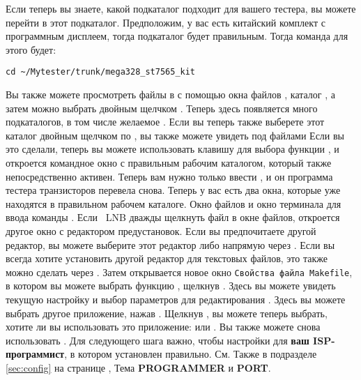 Если теперь вы знаете, какой подкаталог подходит для вашего тестера,
вы можете перейти в этот подкаталог.
Предположим, у вас есть китайский комплект с программным дисплеем,
тогда подкаталог  будет правильным.
Тогда команда для этого будет:
\begin{large} \vspace{-0.4em} \begin{verbatim}
cd ~/Mytester/trunk/mega328_st7565_kit
\end{verbatim} \end{large}
Вы также можете просмотреть файлы в  с помощью окна
файлов ,
каталог , а затем  можно выбрать двойным щелчком \LMB. 
Теперь здесь появляется много подкаталогов, в том числе
желаемое .
Если вы теперь также выберете этот каталог двойным щелчком по \LMB,
вы также можете увидеть  под файлами
Если вы это сделали, теперь вы можете использовать клавишу \RMB для выбора
функции , и откроется командное окно с правильным рабочим каталогом,
который также непосредственно активен.
Теперь вам нужно только ввести , и он программа тестера транзисторов перевела снова.
Теперь у вас есть два окна, которые уже находятся в правильном рабочем каталоге.
Окно файлов и окно терминала для ввода команды .
Если \ LNB дважды щелкнуть файл  в окне файлов, откроется другое окно с редактором предустановок.
Если вы предпочитаете другой редактор, вы можете
выберите этот редактор либо напрямую через \RMB {}.
Если вы всегда хотите установить другой редактор для текстовых файлов,
это также можно сделать через \RMB {}.
Затем открывается новое окно \verb"Свойства файла Makefile",
в котором вы можете выбрать функцию , щелкнув \RMB.
Здесь вы можете увидеть текущую настройку и выбор параметров для редактирования .
Здесь вы можете выбрать другое приложение, нажав \LMB.
Щелкнув \LMB, вы можете теперь выбрать, хотите ли вы использовать это
приложение:  или .
Вы также можете снова использовать .
Для следующего шага важно, чтобы настройки для
\textbf{ваш ISP-программист}, в котором  установлен правильно.
См. Также в подразделе \ref{sec:config} на странице \pageref{sec:config-Prog},
Тема \textbf{PROGRAMMER} и \textbf{PORT}.
